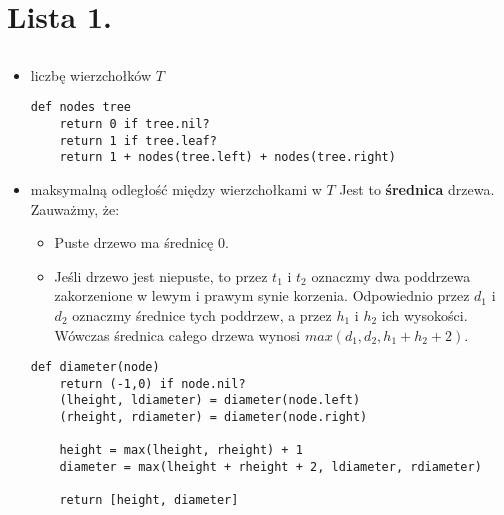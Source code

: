 \chapter{Lista 1.}

\section{}%
\begin{itemize}
\item{liczbę wierzchołków $T$}
\begin{lstlisting}
def nodes tree
	return 0 if tree.nil?
	return 1 if tree.leaf?
	return 1 + nodes(tree.left) + nodes(tree.right)
\end{lstlisting}

\item{maksymalną odległość między wierzchołkami w $T$}
Jest to \textbf{średnica} drzewa.
Zauważmy, że:
\begin{itemize}
\item Puste drzewo ma średnicę $0$.
\item Jeśli drzewo jest niepuste, to przez $t_1$ i $t_2$ oznaczmy dwa poddrzewa zakorzenione w lewym i prawym synie korzenia. Odpowiednio przez $d_1$ i $d_2$ oznaczmy średnice tych poddrzew, a przez $h_1$ i $h_2$ ich wysokości. Wówczas średnica całego drzewa wynosi $max(d_1, d_2, h_1+h_2+2)$.
\end{itemize}
\begin{lstlisting}
def diameter(node) 
	return (-1,0) if node.nil? 
	(lheight, ldiameter) = diameter(node.left)
	(rheight, rdiameter) = diameter(node.right)
	
	height = max(lheight, rheight) + 1
	diameter = max(lheight + rheight + 2, ldiameter, rdiameter)

	return [height, diameter]
\end{lstlisting}
\end{itemize}

